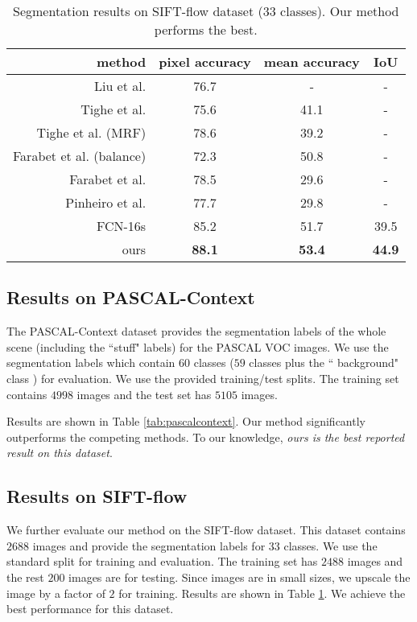 \begin{table}[t]
\caption{Segmentation results on SIFT-flow dataset (33 classes).
Our method performs the best.}
\centering
\resizebox{1\linewidth}{!}
  {
  \begin{tabular}{ r | c c c}
  method	&pixel accuracy	&mean accuracy	&IoU\\ \hline \hline
Liu et al. \cite{liu2011sift}	&76.7	&-	&-\\
Tighe et al. \cite{tighe2013finding} 	&75.6	&41.1	&-\\
Tighe et al. (MRF) \cite{tighe2013finding}	&78.6	&39.2	&-\\
Farabet et al. (balance) \cite{farabet2013learning}	&72.3	&50.8	&-\\
Farabet et al. \cite{farabet2013learning} 	&78.5	&29.6	&-\\
Pinheiro et al. \cite{pinheiro2013recurrent} &77.7 &29.8 &-\\
FCN-16s \cite{LongSD14}	&85.2	&51.7	&39.5\\ \hline
ours	&\bf 88.1	&\bf 53.4	&\bf 44.9\\
 \end{tabular}
  }
\label{tab:siftflow}
\end{table}






\subsection{Results on PASCAL-Context}
The
PASCAL-Context \cite{mottaghi2014role} dataset provides the segmentation labels of the whole scene (including the ``stuff" labels) for the PASCAL VOC images.
We use the segmentation labels which contain $60$ classes ($59$ classes plus the `` background" class ) for evaluation.
We use the provided training/test splits.
The training set contains $4998$ images and the test set has $5105$ images.

Results are shown in Table \ref{tab:pascalcontext}. Our method significantly outperforms the competing methods. To our knowledge, {\em ours is the best reported result on this dataset}.




\subsection{Results on SIFT-flow}

We further evaluate our method on the SIFT-flow dataset.
This dataset contains $2688$ images and provide the segmentation labels for $33$ classes.
We use the standard split for training and evaluation.
The training set has $2488$ images and the rest $200$ images are for testing.
Since images are in small sizes, we upscale the image by a factor of $2$ for training.
Results are shown in Table \ref{tab:siftflow}. We achieve the best performance for this dataset.




